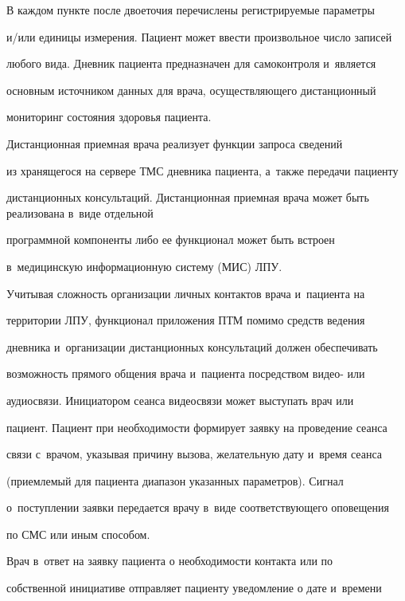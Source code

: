   В каждом пункте после двоеточия перечислены регистрируемые параметры 


и\!/\!или единицы измерения. Пациент может ввести произвольное число записей 


любого вида. Дневник пациента предназначен для самоконтроля и~является 


основным источником данных для врача, осуществляющего дистанционный 


мониторинг состояния здоровья пациента.


  


  Дистанционная приемная врача  реализует функции запроса сведений 


из хранящегося на сервере ТМС дневника пациента, а~также передачи пациенту 


дистанционных консультаций.   Дистанционная приемная врача может быть реализована в~виде отдельной 


программной компоненты либо ее функционал может быть встроен 


в~медицинскую информационную систему (МИС) ЛПУ. 


  


  Учитывая сложность организации личных контактов врача и~пациента на 


территории ЛПУ, функционал приложения ПТМ помимо средств ведения 


дневника и~организации дистанционных консультаций должен обеспечивать 


возможность прямого общения врача и~пациента посредством видео- или 


аудиосвязи. Инициатором сеанса видеосвязи может выступать врач или 


пациент. Пациент при необходимости формирует заявку на проведение сеанса 


связи с~врачом, указывая причину вызова, желательную дату и~время сеанса 


(приемлемый для пациента диапазон указанных параметров). Сигнал 


о~поступлении заявки передается врачу в~виде соответствующего оповещения 


по СМС или иным способом.


  


  Врач в~ответ на заявку пациента о необходимости контакта или по 


собственной инициативе отправляет пациенту уведомление о дате и~времени 



